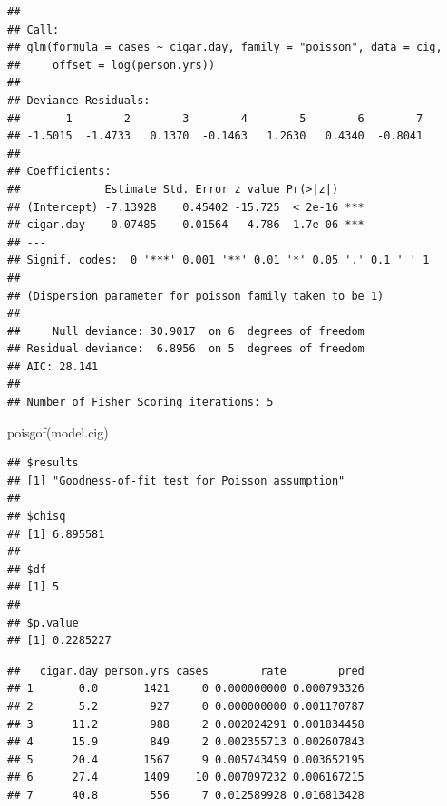 \documentclass[
]{book}
\makeatletter
\newenvironment{Shaded}{\begin{snugshade}}{\end{snugshade}}
\newcommand{\FunctionTok}[1]{\textcolor[rgb]{0,0,0}{#1}}
\newcommand{\NormalTok}[1]{#1}
\newcommand{\OtherTok}[1]{\textcolor[rgb]{0.37,0.37,0.37}{#1}}
\newcommand{\SpecialCharTok}[1]{\textcolor[rgb]{0,0,0}{#1}}
\newenvironment{kframe}{%
\medskip{}
\setlength{\fboxsep}{.8em}
 \def\at@end@of@kframe{}%
 \ifinner\ifhmode%
  \def\at@end@of@kframe{\end{minipage}}%
  \begin{minipage}{\columnwidth}%
 \fi\fi%
 \def\FrameCommand##1{\hskip\@totalleftmargin \hskip-\fboxsep
 \colorbox{shadecolor}{##1}\hskip-\fboxsep
     \hskip-\linewidth \hskip-\@totalleftmargin \hskip\columnwidth}%
 \MakeFramed {\advance\hsize-\width
   \@totalleftmargin\z@ \linewidth\hsize
   \@setminipage}}%
 {\par\unskip\endMakeFramed%
 \at@end@of@kframe}
\renewenvironment{Shaded}{\begin{kframe}}{\end{kframe}}
\makeatother
\begin{document}
\begin{verbatim}
## 
## Call:
## glm(formula = cases ~ cigar.day, family = "poisson", data = cig, 
##     offset = log(person.yrs))
## 
## Deviance Residuals: 
##       1        2        3        4        5        6        7  
## -1.5015  -1.4733   0.1370  -0.1463   1.2630   0.4340  -0.8041  
## 
## Coefficients:
##             Estimate Std. Error z value Pr(>|z|)    
## (Intercept) -7.13928    0.45402 -15.725  < 2e-16 ***
## cigar.day    0.07485    0.01564   4.786  1.7e-06 ***
## ---
## Signif. codes:  0 '***' 0.001 '**' 0.01 '*' 0.05 '.' 0.1 ' ' 1
## 
## (Dispersion parameter for poisson family taken to be 1)
## 
##     Null deviance: 30.9017  on 6  degrees of freedom
## Residual deviance:  6.8956  on 5  degrees of freedom
## AIC: 28.141
## 
## Number of Fisher Scoring iterations: 5
\end{verbatim}

\begin{Shaded}
\begin{Highlighting}[]
\FunctionTok{poisgof}\NormalTok{(model.cig)}
\end{Highlighting}
\end{Shaded}

\begin{verbatim}
## $results
## [1] "Goodness-of-fit test for Poisson assumption"
## 
## $chisq
## [1] 6.895581
## 
## $df
## [1] 5
## 
## $p.value
## [1] 0.2285227
\end{verbatim}

\begin{Shaded}
\end{Shaded}

\begin{verbatim}
##   cigar.day person.yrs cases        rate        pred
## 1       0.0       1421     0 0.000000000 0.000793326
## 2       5.2        927     0 0.000000000 0.001170787
## 3      11.2        988     2 0.002024291 0.001834458
## 4      15.9        849     2 0.002355713 0.002607843
## 5      20.4       1567     9 0.005743459 0.003652195
## 6      27.4       1409    10 0.007097232 0.006167215
## 7      40.8        556     7 0.012589928 0.016813428
\end{verbatim}
\end{document}

